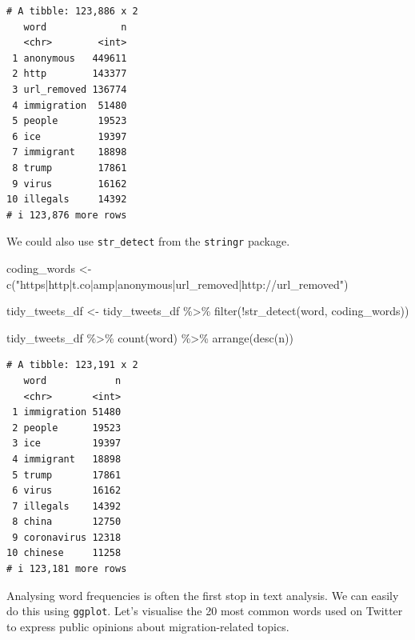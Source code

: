 \documentclass[
  letterpaper,
  DIV=11,
  numbers=noendperiod]{scrreprt}
\newenvironment{Shaded}{\begin{snugshade}}{\end{snugshade}}
\newcommand{\FunctionTok}[1]{\textcolor[rgb]{0.28,0.35,0.67}{#1}}
\newcommand{\NormalTok}[1]{\textcolor[rgb]{0.00,0.23,0.31}{#1}}
\newcommand{\OtherTok}[1]{\textcolor[rgb]{0.00,0.23,0.31}{#1}}
\newcommand{\SpecialCharTok}[1]{\textcolor[rgb]{0.37,0.37,0.37}{#1}}
\newcommand{\StringTok}[1]{\textcolor[rgb]{0.13,0.47,0.30}{#1}}
\begin{document}
\begin{verbatim}
# A tibble: 123,886 x 2
   word             n
   <chr>        <int>
 1 anonymous   449611
 2 http        143377
 3 url_removed 136774
 4 immigration  51480
 5 people       19523
 6 ice          19397
 7 immigrant    18898
 8 trump        17861
 9 virus        16162
10 illegals     14392
# i 123,876 more rows
\end{verbatim}

We could also use \texttt{str\_detect} from the \texttt{stringr}
package.

\begin{Shaded}
\begin{Highlighting}[]
\NormalTok{coding\_words }\OtherTok{\textless{}{-}} \FunctionTok{c}\NormalTok{(}\StringTok{"https|http|t.co|amp|anonymous|url\_removed|http://url\_removed"}\NormalTok{)}

\NormalTok{tidy\_tweets\_df }\OtherTok{\textless{}{-}}\NormalTok{ tidy\_tweets\_df }\SpecialCharTok{\%\textgreater{}\%}
  \FunctionTok{filter}\NormalTok{(}\SpecialCharTok{!}\FunctionTok{str\_detect}\NormalTok{(word, coding\_words)) }

\NormalTok{tidy\_tweets\_df }\SpecialCharTok{\%\textgreater{}\%} 
  \FunctionTok{count}\NormalTok{(word) }\SpecialCharTok{\%\textgreater{}\%} 
  \FunctionTok{arrange}\NormalTok{(}\FunctionTok{desc}\NormalTok{(n))}
\end{Highlighting}
\end{Shaded}

\begin{verbatim}
# A tibble: 123,191 x 2
   word            n
   <chr>       <int>
 1 immigration 51480
 2 people      19523
 3 ice         19397
 4 immigrant   18898
 5 trump       17861
 6 virus       16162
 7 illegals    14392
 8 china       12750
 9 coronavirus 12318
10 chinese     11258
# i 123,181 more rows
\end{verbatim}

Analysing word frequencies is often the first stop in text analysis. We
can easily do this using \texttt{ggplot}. Let's visualise the 20 most
common words used on Twitter to express public opinions about
migration-related topics.
\end{document}
